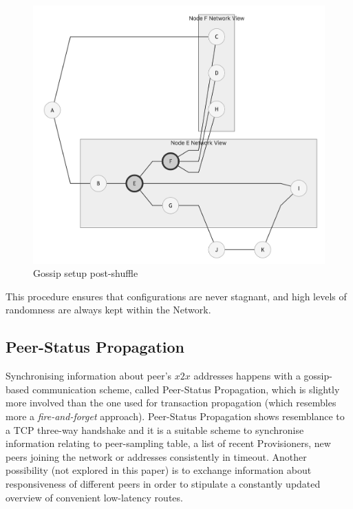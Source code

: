 \begin{figure}
\includegraphics[scale=0.25]{gossip2}
\caption{Gossip setup post-shuffle}
\label{goss2}
\end{figure}


This procedure ensures that configurations are never stagnant, and high
levels of randomness are always kept within the Network.


\subsection{Peer-Status Propagation}

Synchronising information about peer's \(x2x\) addresses happens with a
gossip-based communication scheme, called Peer-Status Propagation, which
is slightly more involved than the one used for transaction propagation
(which resembles more a \emph{fire-and-forget} approach). Peer-Status
Propagation shows resemblance to a TCP three-way handshake and it is a
suitable scheme to synchronise information relating to peer-sampling
table, a list of recent Provisioners, new peers joining the network or
addresses consistently in timeout. Another possibility (not explored in
this paper) is to exchange information about responsiveness of different
peers in order to stipulate a constantly updated overview of convenient
low-latency routes.


